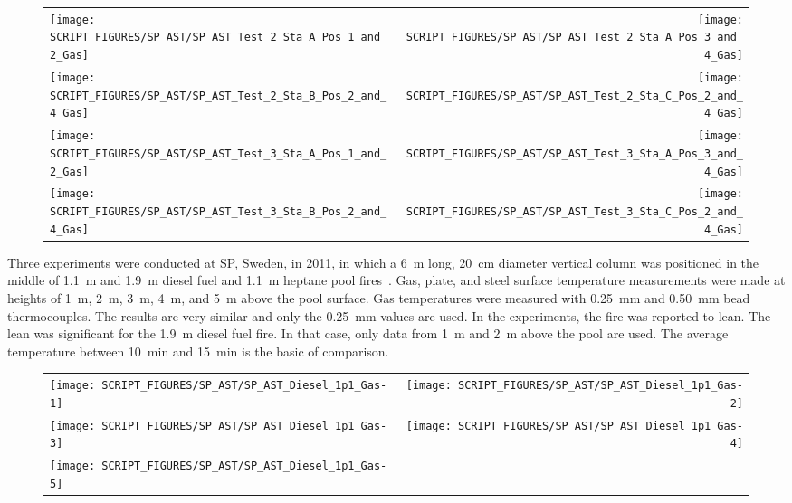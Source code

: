 \newpage

\begin{figure}[p]
\begin{tabular*}{\textwidth}{l@{\extracolsep{\fill}}r}
\texttt{[image: SCRIPT\_FIGURES/SP\_AST/SP\_AST\_Test\_2\_Sta\_A\_Pos\_1\_and\_2\_Gas]} &
\texttt{[image: SCRIPT\_FIGURES/SP\_AST/SP\_AST\_Test\_2\_Sta\_A\_Pos\_3\_and\_4\_Gas]} \\
\texttt{[image: SCRIPT\_FIGURES/SP\_AST/SP\_AST\_Test\_2\_Sta\_B\_Pos\_2\_and\_4\_Gas]} &
\texttt{[image: SCRIPT\_FIGURES/SP\_AST/SP\_AST\_Test\_2\_Sta\_C\_Pos\_2\_and\_4\_Gas]} \\
\texttt{[image: SCRIPT\_FIGURES/SP\_AST/SP\_AST\_Test\_3\_Sta\_A\_Pos\_1\_and\_2\_Gas]} &
\texttt{[image: SCRIPT\_FIGURES/SP\_AST/SP\_AST\_Test\_3\_Sta\_A\_Pos\_3\_and\_4\_Gas]} \\
\texttt{[image: SCRIPT\_FIGURES/SP\_AST/SP\_AST\_Test\_3\_Sta\_B\_Pos\_2\_and\_4\_Gas]} &
\texttt{[image: SCRIPT\_FIGURES/SP\_AST/SP\_AST\_Test\_3\_Sta\_C\_Pos\_2\_and\_4\_Gas]}
\end{tabular*}
\label{SP_Test_2_3_Gas}
\end{figure}

\clearpage

Three experiments were conducted at SP, Sweden, in 2011, in which a 6~m long, 20~cm diameter vertical column was positioned in the middle of 1.1~m and 1.9~m diesel fuel and 1.1~m heptane pool fires~\cite{Sjostrom:AST}. Gas, plate, and steel surface temperature measurements were made at heights of 1~m, 2~m, 3~m, 4~m, and 5~m above the pool surface. Gas temperatures were measured with 0.25~mm and 0.50~mm bead thermocouples. The results are very similar and only the 0.25~mm values are used. In the experiments, the fire was reported to lean. The lean was significant for the 1.9~m diesel fuel fire. In that case, only data from 1~m and 2~m above the pool are used. The average temperature between 10~min and 15~min is the basic of comparison.

\begin{figure}[h!]
\begin{tabular*}{\textwidth}{l@{\extracolsep{\fill}}r}
\texttt{[image: SCRIPT\_FIGURES/SP\_AST/SP\_AST\_Diesel\_1p1\_Gas-1]}   &  \texttt{[image: SCRIPT\_FIGURES/SP\_AST/SP\_AST\_Diesel\_1p1\_Gas-2]}    \\
\texttt{[image: SCRIPT\_FIGURES/SP\_AST/SP\_AST\_Diesel\_1p1\_Gas-3]}   &  \texttt{[image: SCRIPT\_FIGURES/SP\_AST/SP\_AST\_Diesel\_1p1\_Gas-4]}     \\
\texttt{[image: SCRIPT\_FIGURES/SP\_AST/SP\_AST\_Diesel\_1p1\_Gas-5]}   &
\end{tabular*}
\label{SP_Diesel_1p1_Gas}
\end{figure}


